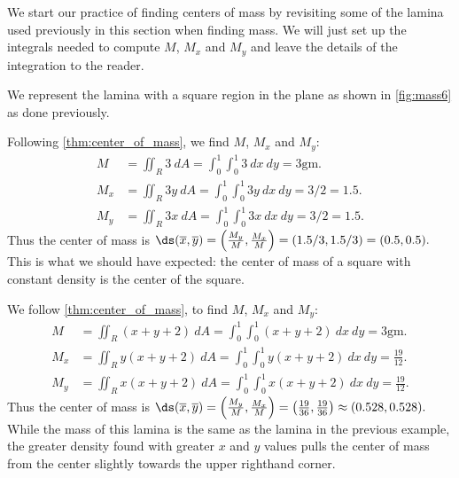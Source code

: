 We start our practice of finding centers of mass by revisiting some of the lamina used previously in this section when finding mass. We will  just set up the integrals needed to compute $M$, $M_x$ and $M_y$ and leave the details of the integration to the reader.

{We represent the lamina with a square region in the plane as shown in \autoref{fig:mass6} as done previously. 

Following \autoref{thm:center_of_mass}, we find $M$, $M_x$ and $M_y$:
\begin{align*}
M &= \iint_R 3\ dA = \int_0^1\int_0^1 3\ dx\ dy =3\text{gm}.\\
M_x &= \iint_R 3y\ dA = \int_0^1\int_0^1 3y\ dx\ dy =3/2 = 1.5.\\
M_y &= \iint_R 3x\ dA = \int_0^1\int_0^1 3x\ dx\ dy =3/2 = 1.5.
\end{align*}
Thus the center of mass is $\ds (\overline{x},\overline{y}) = \left(\frac{M_y}M,\frac{M_x}M\right) = (1.5/3,1.5/3) = (0.5,0.5).$ This is what we should have expected: the center of mass of a square with constant density is the center of the square.}

{We follow \autoref{thm:center_of_mass}, to find $M$, $M_x$ and $M_y$:
\begin{align*}
M &= \iint_R (x+y+2)\ dA = \int_0^1\int_0^1 (x+y+2)\ dx\ dy =3\text{gm}.\\
M_x &= \iint_R y(x+y+2)\ dA = \int_0^1\int_0^1 y(x+y+2)\ dx\ dy =\frac{19}{12}.\\
M_y &= \iint_R x(x+y+2)\ dA = \int_0^1\int_0^1 x(x+y+2)\ dx\ dy =\frac{19}{12}.
\end{align*}
Thus the center of mass is $\ds (\overline{x},\overline{y}) = \left(\frac{M_y}M,\frac{M_x}M\right) = \left(\frac{19}{36},\frac{19}{36}\right) \approx (0.528,0.528).$ While the mass of this lamina is the same as the lamina in the previous example, the greater density found with greater $x$ and $y$ values pulls the center of mass from the center slightly towards the upper righthand corner.}


